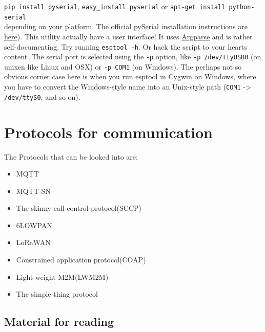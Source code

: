 \documentclass[16pt]{article}
\begin{document}
\texttt{pip install pyserial},
\texttt{easy\_install pyserial} or
\texttt{apt-get install python-serial} \\
\vspace{0.3cm}
depending on your platform. The
official pySerial installation instructions are
\href{http://pyserial.sourceforge.net/pyserial.html\#installation}{here}).
This utility actually have a user interface! It uses
\href{https://docs.python.org/dev/library/argparse.html}{Argparse}
and is rather self-documenting. Try running \texttt{esptool -h}. Or hack the
script to your hearts content. The serial port is selected using the
\texttt{-p} option, like \texttt{-p /dev/ttyUSB0} (on unixen like Linux
and OSX) or \texttt{-p COM1} (on Windows). The perhaps not so obvious
corner case here is when you run esptool in Cygwin on Windows, where you
have to convert the Windows-style name into an Unix-style path
(\texttt{COM1} -\textgreater{} \texttt{/dev/ttyS0}, and so on).

\vspace{9cm}


\section{Protocols for communication}

\vspace{0.5cm}

The Protocols that can be looked into are:

\begin{itemize}

\item
  MQTT
\item
  MQTT-SN
\item
  The skinny call control protocol(SCCP)
\item
  6LOWPAN
\item
  LoRaWAN
\item
  Constrained application protocol(COAP)
\item
  Light-weight M2M(LWM2M)
\item
  The simple thing protocol
\end{itemize}

\subsection{Material for reading}
\end{document}
